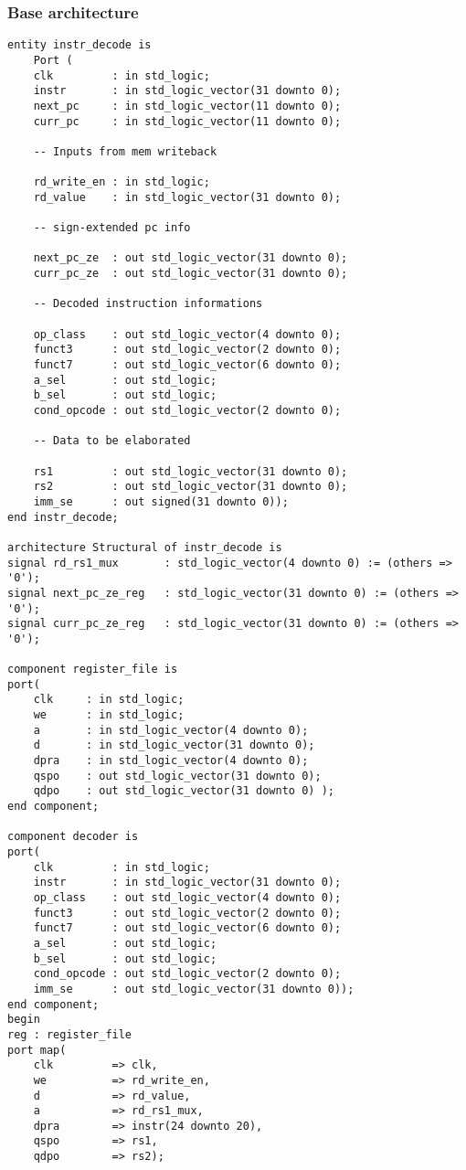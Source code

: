 \subsubsection{Base architecture}
\begin{code}
\label{code:ID_code}  
\begin{verbatim}
entity instr_decode is
    Port (
    clk         : in std_logic;
    instr       : in std_logic_vector(31 downto 0);
    next_pc     : in std_logic_vector(11 downto 0);
    curr_pc     : in std_logic_vector(11 downto 0);
    
    -- Inputs from mem writeback
    
    rd_write_en : in std_logic;
    rd_value    : in std_logic_vector(31 downto 0);
    
    -- sign-extended pc info
    
    next_pc_ze  : out std_logic_vector(31 downto 0);
    curr_pc_ze  : out std_logic_vector(31 downto 0);
    
    -- Decoded instruction informations
    
    op_class    : out std_logic_vector(4 downto 0);
    funct3      : out std_logic_vector(2 downto 0);
    funct7      : out std_logic_vector(6 downto 0);
    a_sel       : out std_logic;
    b_sel       : out std_logic;
    cond_opcode : out std_logic_vector(2 downto 0);
    
    -- Data to be elaborated
    
    rs1         : out std_logic_vector(31 downto 0);
    rs2         : out std_logic_vector(31 downto 0);
    imm_se      : out signed(31 downto 0));
end instr_decode;

architecture Structural of instr_decode is
signal rd_rs1_mux       : std_logic_vector(4 downto 0) := (others => '0');
signal next_pc_ze_reg   : std_logic_vector(31 downto 0) := (others => '0');
signal curr_pc_ze_reg   : std_logic_vector(31 downto 0) := (others => '0');
    
component register_file is
port(
    clk     : in std_logic;
    we      : in std_logic;
    a       : in std_logic_vector(4 downto 0);
    d       : in std_logic_vector(31 downto 0);
    dpra    : in std_logic_vector(4 downto 0);
    qspo    : out std_logic_vector(31 downto 0);
    qdpo    : out std_logic_vector(31 downto 0) );
end component;

component decoder is
port(
    clk         : in std_logic;
    instr       : in std_logic_vector(31 downto 0);
    op_class    : out std_logic_vector(4 downto 0);
    funct3      : out std_logic_vector(2 downto 0);
    funct7      : out std_logic_vector(6 downto 0);
    a_sel       : out std_logic;
    b_sel       : out std_logic;
    cond_opcode : out std_logic_vector(2 downto 0);
    imm_se      : out std_logic_vector(31 downto 0));
end component;
begin
reg : register_file
port map(
    clk         => clk,
    we          => rd_write_en,
    d           => rd_value,
    a           => rd_rs1_mux,
    dpra        => instr(24 downto 20),
    qspo        => rs1,
    qdpo        => rs2);


\end{verbatim}
\end{code}
